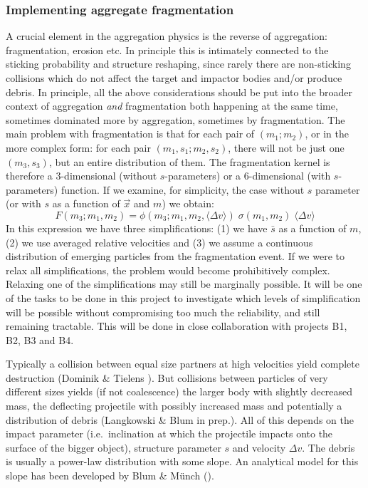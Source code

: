 \subsubsection{Implementing aggregate fragmentation}
A crucial element in the aggregation physics is the reverse of aggregation:
fragmentation, erosion etc. In principle this is intimately connected to the
sticking probability and structure reshaping, since rarely there are
non-sticking collisions which do not affect the target and impactor bodies
and/or produce debris. In principle, all the above considerations should be
put into the broader context of aggregation {\em and} fragmentation both
happening at the same time, sometimes dominated more by aggregation,
sometimes by fragmentation. The main problem with fragmentation is that for
each pair of $(m_1;m_2)$, or in the more complex form: for each pair
$(m_1,s_1;m_2,s_2)$, there will not be just one $(m_3,s_3)$, but an entire
distribution of them. The fragmentation kernel is therefore a 3-dimensional
(without $s$-parameters) or a 6-dimensional (with $s$-parameters) function.
If we examine, for simplicity, the case without $s$ parameter (or with $s$
as a function of $\vec x$ and $m$) we obtain:
\begin{equation}\label{eq-fragkern-1}
F(m_3;m_1,m_2) = \phi(m_3;m_1,m_2,\langle\Delta v\rangle)\;
\sigma(m_1,m_2)\; \langle\Delta v\rangle
\end{equation}
In this expression we have three simplifications: (1) we have  $\bar s$ as
a function of $m$, (2) we use averaged relative velocities and (3) we 
assume a continuous distribution of emerging particles from the
fragmentation event. If we were to relax all simplifications, the problem
would become prohibitively complex.  Relaxing one of the simplifications
may still be marginally possible.  It will be one of the tasks to be done in
this project to investigate which levels of simplification will be possible
without compromising too much the reliability, and still remaining
tractable. This will be done in close collaboration with projects
B1, B2, B3 and B4.

Typically a collision between equal size partners at high velocities yield
complete destruction (Dominik \& Tielens ). But collisions between
particles of very different sizes yields (if not coalescence) the larger
body with slightly decreased mass, the deflecting projectile with possibly
increased mass and potentially a distribution of debris (Langkowski \& Blum
in prep.). All of this depends on the impact parameter (i.e.~inclination at
which the projectile impacts onto the surface of the bigger object),
structure parameter $s$ and velocity $\Delta v$.  The debris is usually a
power-law distribution with some slope. An analytical model for this slope
has been developed by Blum \& M\"unch ().


